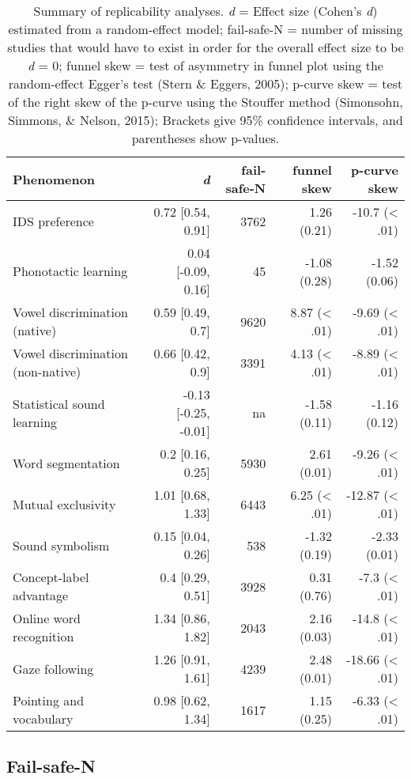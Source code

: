 \documentclass[english,floatsintext,man]{apa6}
\begin{document}
\begin{table}[t]
\footnotesize
\begin{tabular}{lrrrr}
\toprule
\textbf{Phenomenon} & \textbf{\textit{d}} & \textbf{fail-safe-N} & \textbf{funnel skew} & \textbf{p-curve skew}\\
\midrule

IDS preference & 0.72 [0.54, 0.91] & 3762 & 1.26 (0.21) & -10.7 (< .01)\\
Phonotactic learning & 0.04 [-0.09, 0.16] & 45 & -1.08 (0.28) & -1.52 (0.06)\\
Vowel discrimination (native) & 0.59 [0.49, 0.7] & 9620 & 8.87 (< .01) & -9.69 (< .01)\\
Vowel discrimination (non-native) & 0.66 [0.42, 0.9] & 3391 & 4.13 (< .01) & -8.89 (< .01)\\
Statistical sound learning & -0.13 [-0.25, -0.01] & na & -1.58 (0.11) & -1.16 (0.12)\\
Word segmentation & 0.2 [0.16, 0.25] & 5930 & 2.61 (0.01) & -9.26 (< .01)\\
Mutual exclusivity & 1.01 [0.68, 1.33] & 6443 & 6.25 (< .01) & -12.87 (< .01)\\
Sound symbolism & 0.15 [0.04, 0.26] & 538 & -1.32 (0.19) & -2.33 (0.01)\\
Concept-label advantage & 0.4 [0.29, 0.51] & 3928 & 0.31 (0.76) & -7.3 (< .01)\\
Online word recognition & 1.34 [0.86, 1.82] & 2043 & 2.16 (0.03) & -14.8 (< .01)\\
Gaze following & 1.26 [0.91, 1.61] & 4239 & 2.48 (0.01) & -18.66 (< .01)\\
Pointing and vocabulary & 0.98 [0.62, 1.34] & 1617 & 1.15 (0.25) & -6.33 (< .01)\\

\bottomrule
\end{tabular}
\caption{Summary of replicability analyses. \textit{d} = Effect size (Cohen's {\it d}) estimated from a random-effect model; fail-safe-N = number of missing studies that would have to exist in order for the overall effect size to be {\it d} = 0; funnel skew = test of asymmetry in funnel plot using the random-effect Egger's test (Stern \& Eggers, 2005); p-curve skew = test of the right skew of the p-curve using the Stouffer method (Simonsohn, Simmons, \& Nelson, 2015); Brackets give 95\% confidence intervals, and parentheses show p-values.}
\end{table}

\subsection{Fail-safe-N}\label{fail-safe-n}
\end{document}
